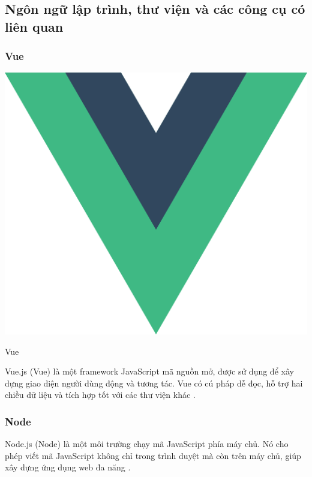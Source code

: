 \subsection{Ngôn ngữ lập trình, thư viện và các công cụ có liên quan}

\subsubsection{Vue}
\begin{center}
  \begin{minipage}{.3\linewidth}
    \captionsetup{type=figure, width=.93\linewidth}
    \includegraphics[width=\linewidth]{images/vue.png}
    \caption{\centering Vue}
    \label{fig:vue}
  \end{minipage}%
\end{center}

Vue.js (Vue) là một framework JavaScript mã nguồn mở, được sử dụng để xây dựng giao diện người dùng động và tương tác.
Vue có cú pháp dễ đọc, hỗ trợ hai chiều dữ liệu và tích hợp tốt với các thư viện khác \cite{vue}.

\subsubsection{Node}

Node.js (Node) là một môi trường chạy mã JavaScript phía máy chủ.
Nó cho phép viết mã JavaScript không chỉ trong trình duyệt mà còn trên máy chủ, giúp xây dựng ứng dụng web đa năng \cite{node}.

